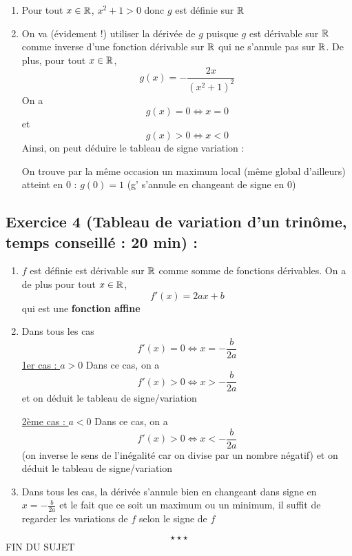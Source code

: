 \begin{enumerate}
\item Pour tout $x\in\mathbb{R}$, $x^2+1 > 0$ donc $g$ est définie sur $\mathbb{R}$
\item On va (évidement !) utiliser la dérivée de $g$ puisque $g$ est dérivable sur $\mathbb{R}$ comme inverse d'une fonction dérivable sur $\mathbb{R}$ qui ne s'annule pas sur $\mathbb{R}$. De plus, pour tout $x\in \mathbb{R}$, 
$$g(x) = - \frac{2x}{(x^2+1)^2}$$
On a $$g(x) = 0 \Leftrightarrow x=0$$ et $$g(x) > 0 \Leftrightarrow x<0$$
Ainsi, on peut déduire le tableau de signe variation : \newline
{}\newline
On trouve par la même occasion un maximum local (même global d'ailleurs) atteint en 0 : $g(0)=1$ (g' s'annule en changeant de signe en 0)
\end{enumerate}
\subsection*{Exercice 4 (Tableau de variation d'un trinôme, temps conseillé : 20 min) : }
\begin{enumerate}
\item $f$ est définie est dérivable sur $\mathbb{R}$ comme somme de fonctions dérivables. On a de plus pour tout $x\in \mathbb{R}$, 
$$\boxed{f'(x) = 2ax+b}$$ qui est une \textbf{fonction affine}
\item Dans tous les cas 
$$f'(x) = 0 \Leftrightarrow x = -\frac{b}{2a}$$
\underline{1er cas : $a > 0$}\newline
Dans ce cas, on a $$f'(x) > 0 \Leftrightarrow x > -\frac{b}{2a}$$ et on déduit le tableau de signe/variation \newline
{}\newline
\underline{2ème cas : $a < 0$}\newline
Dans ce cas, on a $$f'(x) > 0 \Leftrightarrow x < -\frac{b}{2a}$$ (on inverse le sens de l'inégalité car on divise par un nombre négatif) et on déduit le tableau de signe/variation \newline
{}\newline
\item Dans tous les cas, la dérivée s'annule bien en changeant dans signe en $\displaystyle x=-\frac{b}{2a}$ et le fait que ce soit un maximum ou un minimum, il suffit de regarder les variations de $f$ selon le signe de $f$
\end{enumerate}
$$\star \star \star$$
\center
FIN DU SUJET
